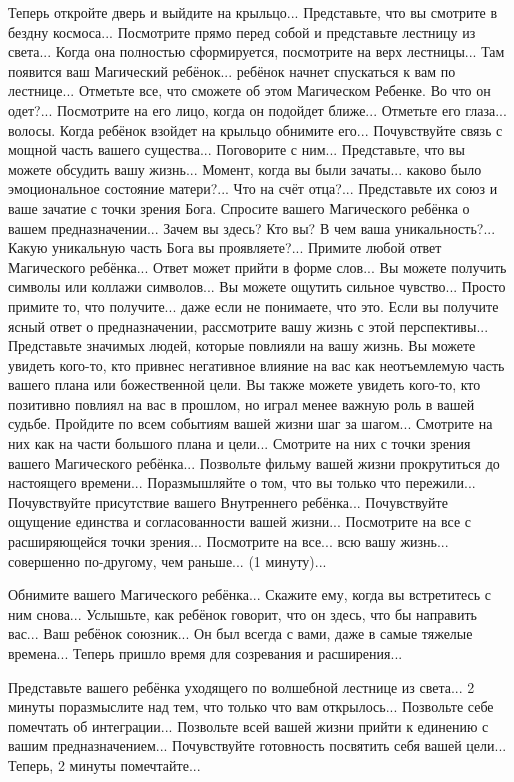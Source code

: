 \documentclass[10pt, fleqn]{article}
\begin{document}
Теперь откройте дверь и выйдите на крыльцо... Представьте, что вы смотрите в бездну космоса... Посмотрите прямо перед собой и представьте лестницу из света... Когда она полностью сформируется, посмотрите на верх лестницы... Там появится ваш Магический ребёнок... ребёнок начнет спускаться к вам по лестнице... Отметьте все, что сможете об этом Магическом Ребенке. Во что он одет?... Посмотрите на его лицо, когда он подойдет ближе... Отметьте его глаза... волосы. Когда ребёнок взойдет на крыльцо обнимите его... Почувствуйте связь с мощной часть вашего существа... Поговорите с ним... Представьте, что вы можете обсудить вашу жизнь... Момент, когда вы были зачаты... каково было эмоциональное состояние матери?... Что на счёт отца?... Представьте их союз и ваше зачатие с точки зрения Бога. Спросите вашего Магического ребёнка о вашем предназначении... Зачем вы здесь? Кто вы? В чем ваша уникальность?... Какую уникальную часть Бога вы проявляете?... Примите любой ответ Магического ребёнка... Ответ может прийти в форме слов... Вы можете получить символы или коллажи символов... Вы можете ощутить сильное чувство... Просто примите то, что получите... даже если не понимаете, что это. Если вы получите ясный ответ о предназначении, рассмотрите вашу жизнь с этой перспективы... Представьте значимых людей, которые повлияли на вашу жизнь. Вы можете увидеть кого-то, кто привнес негативное влияние на вас как неотъемлемую часть вашего плана или божественной цели. Вы также можете увидеть кого-то, кто позитивно повлиял на вас в прошлом, но играл менее важную роль в вашей судьбе. Пройдите по всем событиям вашей жизни шаг за шагом... Смотрите на них как на части большого плана и цели... Смотрите на них с точки зрения вашего Магического ребёнка... Позвольте фильму вашей жизни прокрутиться до настоящего времени... Поразмышляйте о том, что вы только что пережили... Почувствуйте присутствие вашего Внутреннего ребёнка... Почувствуйте ощущение единства и согласованности вашей жизни... Посмотрите на все с расширяющейся точки зрения... Посмотрите на все... всю вашу жизнь... совершенно по-другому, чем раньше... (1 минуту)...

Обнимите вашего Магического ребёнка... Скажите ему, когда вы встретитесь с ним снова... Услышьте, как ребёнок говорит, что он здесь, что бы направить вас... Ваш ребёнок союзник... Он был всегда с вами, даже в самые тяжелые времена... Теперь пришло время для созревания и расширения...

Представьте вашего ребёнка уходящего по волшебной лестнице из света... 2 минуты поразмыслите над тем, что только что вам открылось... Позвольте себе помечтать об интеграции... Позвольте всей вашей жизни прийти к единению с вашим предназначением... Почувствуйте готовность посвятить себя вашей цели... Теперь, 2 минуты помечтайте...
\end{document}
